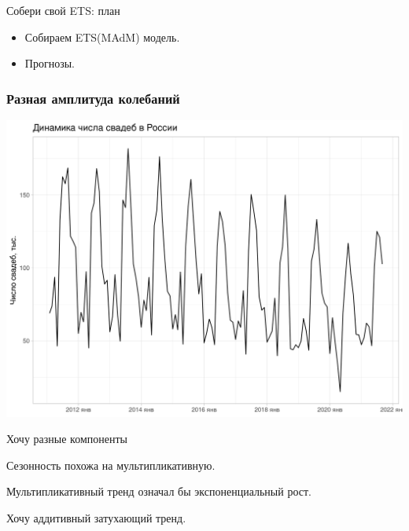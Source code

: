 
\begin{frame} %


\end{frame}



\begin{frame}{Собери свой ETS: план}
  \begin{itemize}[<+->]
    \item Собираем ETS(MAdM) модель. 
    \item Прогнозы.
  \end{itemize}

\end{frame}


\begin{frame}
  \frametitle{Разная амплитуда колебаний}

  \includegraphics[width=\textwidth]{pictures/om_ts_03-060.png}


\end{frame}


\begin{frame}{Хочу разные компоненты}

Сезонность похожа на \alert{мультипликативную}.

\pause

Мультипликативный тренд означал бы \alert{экспоненциальный} рост.

\pause 

Хочу \alert{аддитивный} затухающий тренд.


\end{frame}



